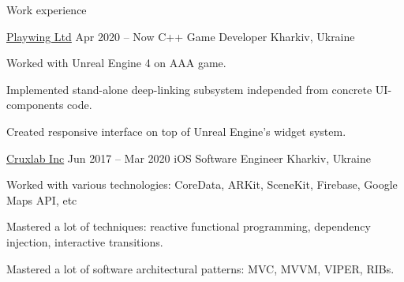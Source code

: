 \documentclass{resume} %
\begin{document}
\begin{rSection}{Work experience}
  \begin{rSubsection}
    {\href{https://playwing.com}{Playwing Ltd}}
    {Apr 2020 -- Now}
    {C++ Game Developer}
    {Kharkiv, Ukraine}
    \item Worked with Unreal Engine 4 on AAA game.
    \item Implemented stand-alone deep-linking subsystem independed from concrete UI-components code.
    \item Created responsive interface on top of Unreal Engine's widget system.
  \end{rSubsection}

  \begin{rSubsection}
    {\href{https://cruxlab.com/}{Cruxlab Inc}}
    {Jun 2017 -- Mar 2020}
    {iOS Software Engineer}
    {Kharkiv, Ukraine}

    \item Worked with various technologies: CoreData, ARKit, SceneKit, Firebase, Google Maps API, etc
    \item Mastered a lot of techniques: reactive functional programming, dependency injection, interactive transitions.
    \item Mastered a lot of software architectural patterns: MVC, MVVM, VIPER, RIBs.
  \end{rSubsection}
\end{rSection}

\end{document}
